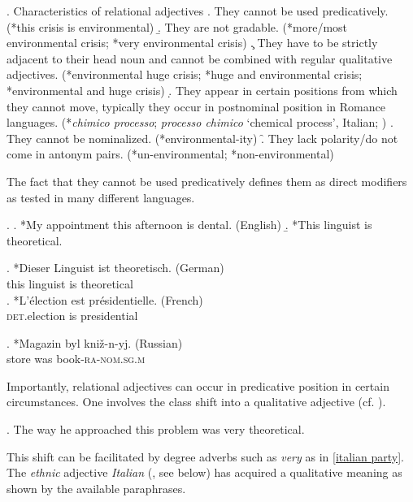 \ex. Characteristics of relational adjectives
\a. They cannot be used predicatively. (*this crisis is environmental)
\b. They are not gradable. (*more/most environmental crisis; *very environmental crisis)
\c. They have to be strictly adjacent to their head noun and cannot be combined with regular qualitative adjectives. (*environmental huge crisis; *huge and environmental crisis; *environmental and huge crisis)
\d. They appear in certain positions from which they cannot move, typically they occur in postnominal position in Romance languages. (*\textit{chimico processo}; \textit{processo chimico} `chemical process', Italian; \citealt[59]{bortolotto:2016:RA})
\e. They cannot be nominalized. (*environmental-ity)
\f. They lack polarity/do not come in antonym pairs. (*un-environmen\-tal; *non-environmental)

The fact that they cannot be used predicatively defines them as direct modifiers as tested in many different languages.    

\ex. \a. *My appointment this afternoon is dental. (English) \null \hfill \citep[49]{rae:2010:ordering}
\b. *This linguist is theoretical.

\exg. *Dieser Linguist ist theoretisch. (German)\\
this linguist is theoretical \\

\exg. *L’élection est présidentielle. (French)\\
\textsc{det}.election is presidential \\\null \hfill \citep[68]{bortolotto:2016:RA}

\exg. *Magazin byl kni\v{z}-n-yj. (Russian)\\
store was book-\textsc{ra-nom.sg.m} \\ \null \hfill \citep[100]{mezhevich:2002:english}

Importantly, relational adjectives can occur in predicative position in certain circumstances. One involves the class shift into a qualitative adjective (cf. \citealt{nagano:2018:conversion}).

\ex. The way he approached this problem was very theoretical.

This shift can be facilitated by degree adverbs such as \textit{very} as in \ref{italian party}. The \textit{ethnic} adjective \textit{Italian} (\citealt{alex:2011:ea}, see below) has acquired a qualitative meaning as shown by the available paraphrases.

